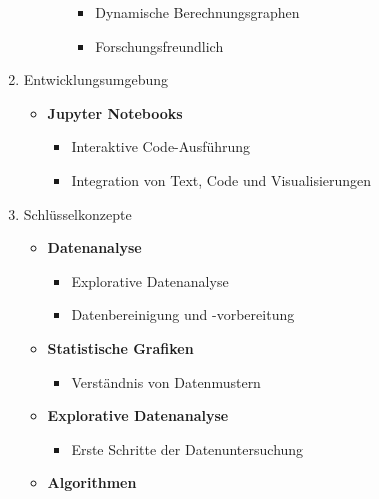 \documentclass{vorlage-design-main}
\begin{document}
\begin{enumerate}
\begin{itemize}
\begin{itemize}
      \begin{itemize}
      
      \item
        Dynamische Berechnungsgraphen
      \item
        Forschungsfreundlich
      \end{itemize}
    \end{itemize}
  \end{itemize}
\item
  Entwicklungsumgebung

  \begin{itemize}
  
  \item
    \textbf{Jupyter Notebooks}

    \begin{itemize}
    
    \item
      Interaktive Code-Ausführung
    \item
      Integration von Text, Code und Visualisierungen
    \end{itemize}
  \end{itemize}
\item
  Schlüsselkonzepte

  \begin{itemize}
  
  \item
    \textbf{Datenanalyse}

    \begin{itemize}
    
    \item
      Explorative Datenanalyse
    \item
      Datenbereinigung und -vorbereitung
    \end{itemize}
  \item
    \textbf{Statistische Grafiken}

    \begin{itemize}
    
    \item
      Verständnis von Datenmustern
    \end{itemize}
  \item
    \textbf{Explorative Datenanalyse}

    \begin{itemize}
    
    \item
      Erste Schritte der Datenuntersuchung
    \end{itemize}
  \item
    \textbf{Algorithmen}


\end{itemize}
\end{enumerate}
\end{document}
